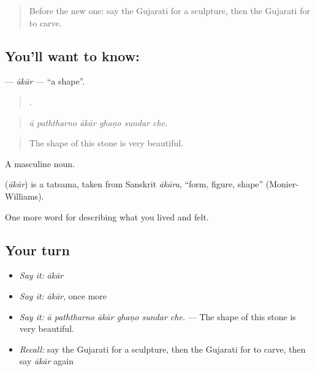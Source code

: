 \label{lesson:GU-C525-akar}



\begin{quote}
Before the new one: say the Gujarati for a sculpture, then the Gujarati for to carve.
\end{quote}

\subsection*{You'll want to know: }
\textbf{} — \emph{ākār} — \textquotedblleft{}a shape\textquotedblright{}.

\begin{quote}
     .
\end{quote}

\begin{quote}
\emph{ā paththarno ākār ghaṇo sundar che.}
\end{quote}

\begin{quote}
The shape of this stone is very beautiful.
\end{quote}

A masculine noun.

\begin{cousinweb}
\textbf{} (\emph{ākār}) is a tatsama, taken from Sanskrit \emph{ākāra}, \textquotedblleft{}form, figure, shape\textquotedblright{} (Monier-Williams).
\end{cousinweb}

\begin{grammarlens}[title={What you've built}]
One more word for describing what you lived and felt.
\end{grammarlens}

\subsection*{Your turn}
\begin{itemize}
\raggedright
  \item \emph{Say it:} \emph{ākār}
  \item \emph{Say it:} \emph{ākār}, once more
  \item \emph{Say it:} \emph{ā paththarno ākār ghaṇo sundar che.} — The shape of this stone is very beautiful.
  \item \emph{Recall:} say the Gujarati for a sculpture, then the Gujarati for to carve, then say \emph{ākār} again
\end{itemize}

